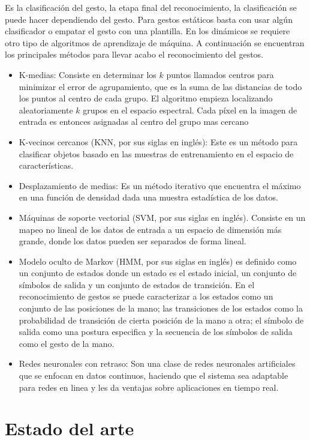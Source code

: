 Es la clasificación del gesto, la etapa final del reconocimiento, la clasificación se puede hacer dependiendo del gesto. Para gestos estáticos basta con usar algún clasificador o empatar el gesto con una plantilla. En los dinámicos se requiere otro tipo de algoritmos de aprendizaje de máquina. A continuación se encuentran los principales métodos para llevar acabo el reconocimiento del gestos. 
\begin{itemize}
	\item K-medias: Consiste en determinar los $k$ puntos llamados centros para minimizar el error de agrupamiento, que es la suma de las distancias de todo los puntos al centro de cada grupo. El algoritmo empieza localizando aleatoriamente $k$ grupos en el espacio espectral. Cada p\'ixel en la imagen de entrada es entonces asignadas al centro del grupo mas cercano  
	\item {K-vecinos cercanos} (KNN, por sus siglas en ingl\'es): 
	Este es un método para clasificar objetos basado en las muestras de entrenamiento en el espacio de características. 
	\item Desplazamiento de medias: Es un método iterativo que encuentra el máximo en una función de densidad dada una muestra estadística de los datos.
	\item Máquinas de soporte vectorial (SVM, por sus siglas en ingl\'es). Consiste en un mapeo no lineal de los datos de entrada a un espacio de dimensi\'on m\'as grande, donde los datos pueden ser separados de forma lineal.  
	\item Modelo oculto de Markov (HMM, por sus siglas en ingl\'es) es definido como un conjunto de estados donde un estado es el estado inicial, un conjunto de símbolos de salida y un conjunto de estados de transición. En el reconocimiento de gestos se puede caracterizar a    los estados como un conjunto de las posiciones de la mano; las  transiciones de los estados como la probabilidad de transición de cierta posición de la mano a otra; el símbolo de salida como una postura especifica y la secuencia de los símbolos de salida como  el gesto de la mano.   
	\item Redes neuronales con retraso: Son una clase de redes neuronales artificiales que se enfocan en datos continuos, haciendo que el sistema sea adaptable para redes en linea y les da ventajas sobre aplicaciones en tiempo real. 
\end{itemize}  

\section{Estado del arte} 

